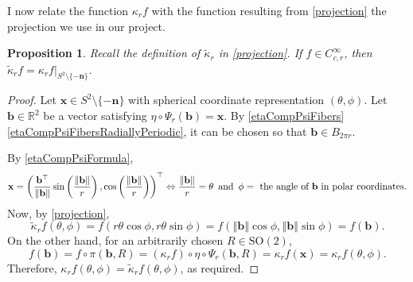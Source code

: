 \documentclass[a4paper,11pt]{scrartcl}
\newcounter{dummy}
\numberwithin{dummy}{section}
\theoremstyle{plain}
\newtheorem{proposition}[dummy]{Proposition}
\theoremstyle{plain}
\theoremstyle{plain}
\theoremstyle{plain}
\theoremstyle{nonumberplain}
\newtheorem{proof}{Proof}
\newcommand{\F}[1][R]{\mathbb{#1}} %
\newcommand{\Ltwonorm}[1]{\left\Vert #1 \right\Vert} %
\newcommand{\SO}{\mathrm{SO}}
\begin{document}
	I now relate the function $ \kappa_{r} f $ with the function resulting from \eqref{projection} the projection we use in our project. 
	\begin{proposition}
		Recall the definition of $ \widetilde{\kappa}_{r}  $ in \eqref{projection}. If $ f \in C_{c,r}^{\infty} $, then $ \widetilde{\kappa}_{r} f = \kappa_{r} f \big|_{S^{2} \setminus \{ - \mathbf{n} \}} $.
	\end{proposition}
	
	\begin{proof}
		Let $ \mathbf{x} \in S^{2} \setminus \{ - \mathbf{n} \} $ with spherical coordinate representation $ (\theta, \phi) $. Let $ \mathbf{b} \in \F^{2} $ be a vector satisfying $ \eta \circ \Psi_{r} (\mathbf{b}) = \mathbf{x} $. By \cref{etaCompPsiFibers}\ref{etaCompPsiFibersRadiallyPeriodic}, it can be chosen so that $ \mathbf{b} \in B_{2 \pi r} $.  
		
		By \cref{etaCompPsiFormula}, 
		\begin{equation*}
		\mathbf{x}
		= \left( \frac{\mathbf{b}^{\top}}{\Ltwonorm{\mathbf{b}}} \sin \left(\frac{\Ltwonorm{\mathbf{b}}}{r}\right), \cos \left(\frac{\Ltwonorm{\mathbf{b}}}{r}\right) \right)^{\top}
		\Leftrightarrow
		\frac{\Ltwonorm{\mathbf{b}}}{r} = \theta
			\enskip \mbox{and} \enskip
			\phi = \mbox{ the angle of $ \mathbf{b} $ in polar coordinates.}
		\end{equation*}
		Now, by \eqref{projection}, 
		\begin{equation*}
		\widetilde{\kappa}_{r} f (\theta, \phi) 
		= f \left( r \theta \cos \phi, r \theta \sin \phi \right)
		= f \left( \Ltwonorm{\mathbf{b}} \cos \phi, \Ltwonorm{\mathbf{b}} \sin \phi \right)
		= f \left( \mathbf{b} \right).
		\end{equation*}
		On the other hand, for an arbitrarily chosen $ R \in \SO(2) $,
		\begin{equation*}
		f ( \mathbf{b} )
		= f \circ \pi (\mathbf{b}, R)
		= (\kappa_{r} f) \circ \eta \circ \Psi_{r} (\mathbf{b}, R)
		= \kappa_{r} f (\mathbf{x})
		= \kappa_{r} f (\theta, \phi).
		\end{equation*}
		Therefore, $ \kappa_{r} f(\theta, \phi) = \widetilde{\kappa}_{r} f (\theta, \phi) $, as required.
	\end{proof}
	
\end{document}
